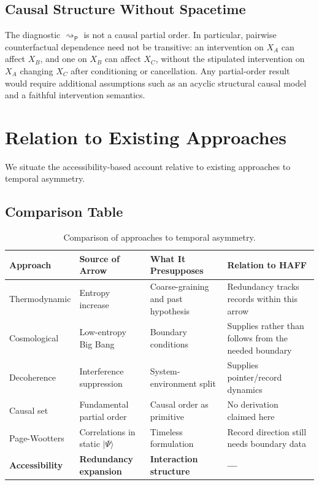 \documentclass[12pt,a4paper,openany]{book}
\begin{document}
\subsection{Causal Structure Without Spacetime}

The diagnostic $\rightsquigarrow_{\mathsf P}$ is not a causal partial order.  In particular, pairwise counterfactual dependence need not be transitive: an intervention on $X_A$ can affect $X_B$, and one on $X_B$ can affect $X_C$, without the stipulated intervention on $X_A$ changing $X_C$ after conditioning or cancellation.  Any partial-order result would require additional assumptions such as an acyclic structural causal model and a faithful intervention semantics.

\section{Relation to Existing Approaches}
\label{F-sec:relations}

We situate the accessibility-based account relative to existing approaches to temporal asymmetry.

\subsection{Comparison Table}

\begin{table}[ht]
\centering
\small
\begin{tabular}{|P{2.8cm}|P{3.5cm}|P{3.5cm}|P{3cm}|}
\hline
\textbf{Approach} & \textbf{Source of Arrow} & \textbf{What It Presupposes} & \textbf{Relation to HAFF} \\
\hline
Thermodynamic & Entropy increase & Coarse-graining and past hypothesis & Redundancy tracks records within this arrow \\
\hline
Cosmological & Low-entropy Big Bang & Boundary conditions & Supplies rather than follows from the needed boundary \\
\hline
Decoherence & Interference suppression & System-environment split & Supplies pointer/record dynamics \\
\hline
Causal set & Fundamental partial order & Causal order as primitive & No derivation claimed here \\
\hline
Page-Wootters & Correlations in static $|\Psi\rangle$ & Timeless formulation & Record direction still needs boundary data \\
\hline
\textbf{Accessibility} & \textbf{Redundancy expansion} & \textbf{Interaction structure} & \textbf{---} \\
\hline
\end{tabular}
\caption{Comparison of approaches to temporal asymmetry.}
\label{F-tab:comparison}
\end{table}
\end{document}
